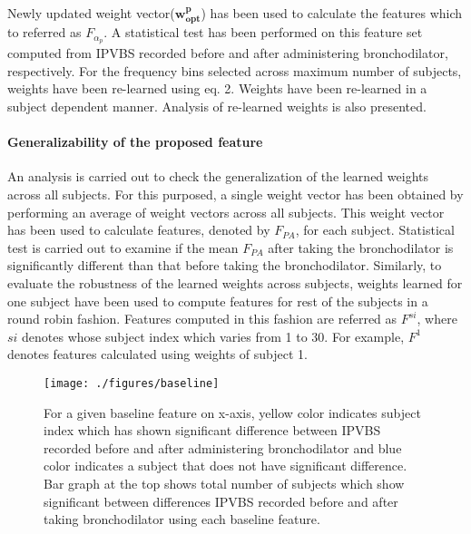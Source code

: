 \documentclass{article}
\begin{document}
Newly updated weight vector(\(\boldsymbol{w_{opt}^p}\)) has been used to calculate the features which to referred as $F_{\alpha_{p}}$. A statistical test has been performed on this feature set computed from IPVBS recorded before and after administering bronchodilator, respectively. 
For the frequency bins selected across maximum number of subjects, weights have been re-learned using eq. 2. Weights have been re-learned in a subject dependent manner. Analysis of re-learned weights is also presented.

\paragraph{Generalizability of the proposed feature} 
An analysis is carried out to check the generalization of the learned weights across all subjects. For this purposed, a single weight vector has been obtained by performing an average of weight vectors across all subjects. This weight vector has been used to calculate features, denoted by $F_{PA}$, for each subject. Statistical test is carried out to examine if the mean $F_{PA}$ after taking the bronchodilator is significantly different than that before taking the bronchodilator. Similarly, to evaluate the robustness of the learned weights across subjects, weights learned for one subject have been used to compute features for rest of the subjects in a round robin fashion. Features computed in this fashion are referred as $F^{si}$, where $si$ denotes whose subject index which varies from 1 to 30. For example, $F^{1}$ denotes features calculated using weights of subject 1.



\begin{figure}[ht]
	\centering
	\texttt{[image: ./figures/baseline]}
	
	\caption{For a given baseline feature on x-axis, yellow color indicates subject index which has shown significant difference between IPVBS recorded before and after administering bronchodilator and blue color indicates a subject that does not have significant difference. Bar graph at the top shows total number of subjects which show significant between differences IPVBS recorded before and after taking bronchodilator using each baseline feature.}
	\label{fig:baseline}
\end{figure}
\end{document}
